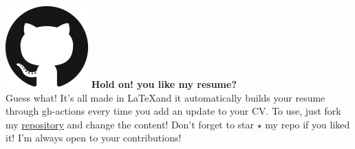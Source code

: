 \documentclass[11pt, a4paper, sans]{moderncv}
\begin{document}
    \pagestyle{empty}
    
    
    \hspace{8mm}
    \newline
    \includegraphics[scale=.4]{Images/gh.png}
    \Large{\textbf{Hold on! you like my resume?} \\
    Guess what! It's all made in \LaTeX  and it automatically builds your resume through gh-actions every time you add an update to your CV. To use, just fork my \href{https://github.com/Ehsan2754/Resume.git}{\color{blue}repository} and change the content! Don't forget to star $\star$ my repo if you liked it! I'm always open to your contributions! }
\end{document}

